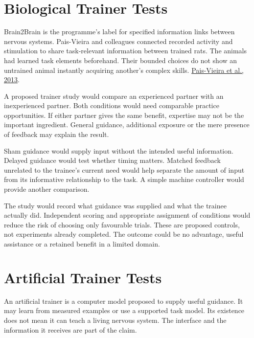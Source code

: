 \section{Biological Trainer Tests}

Brain2Brain is the programme's label for specified information links between nervous systems. Pais-Vieira and colleagues connected recorded activity and stimulation to share task-relevant information between trained rats. The animals had learned task elements beforehand. Their bounded choices do not show an untrained animal instantly acquiring another's complex skills. \href{https://www.nature.com/articles/srep01319}{Pais-Vieira et al., 2013}.\par

A proposed trainer study would compare an experienced partner with an inexperienced partner. Both conditions would need comparable practice opportunities. If either partner gives the same benefit, expertise may not be the important ingredient. General guidance, additional exposure or the mere presence of feedback may explain the result.\par

Sham guidance would supply input without the intended useful information. Delayed guidance would test whether timing matters. Matched feedback unrelated to the trainee's current need would help separate the amount of input from its informative relationship to the task. A simple machine controller would provide another comparison.\par

The study would record what guidance was supplied and what the trainee actually did. Independent scoring and appropriate assignment of conditions would reduce the risk of choosing only favourable trials. These are proposed controls, not experiments already completed. The outcome could be no advantage, useful assistance or a retained benefit in a limited domain.\par

\section{Artificial Trainer Tests}

An artificial trainer is a computer model proposed to supply useful guidance. It may learn from measured examples or use a supported task model. Its existence does not mean it can teach a living nervous system. The interface and the information it receives are part of the claim.\par


